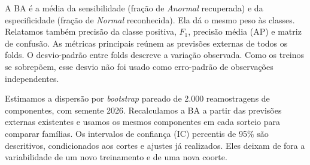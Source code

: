 A BA é a média da sensibilidade (fração de \textit{Anormal} recuperada) e da especificidade (fração de \textit{Normal} reconhecida). Ela dá o mesmo peso às classes. Relatamos também precisão da classe positiva, \(F_1\), precisão média (AP) e matriz de confusão. As métricas principais reúnem as previsões externas de todos os folds. O desvio-padrão entre folds descreve a variação observada. Como os treinos se sobrepõem, esse desvio não foi usado como erro-padrão de observações independentes.

Estimamos a dispersão por \textit{bootstrap} pareado \cite{efron1979} de 2.000 reamostragens de componentes, com semente 2026. Recalculamos a BA a partir das previsões externas existentes e usamos os mesmos componentes em cada sorteio para comparar famílias. Os intervalos de confiança (IC) percentis de 95\% são descritivos, condicionados aos cortes e ajustes já realizados. Eles deixam de fora a variabilidade de um novo treinamento e de uma nova coorte.
